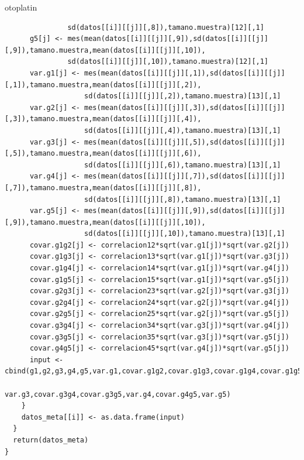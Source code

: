 otoplatin\documentclass[a4paper,openright,12pt]{report}
\begin{document}
{\begin{verbatim}
               sd(datos[[i]][[j]][,8]),tamano.muestra)[12][,1]
      g5[j] <- mes(mean(datos[[i]][[j]][,9]),sd(datos[[i]][[j]][,9]),tamano.muestra,mean(datos[[i]][[j]][,10]),
               sd(datos[[i]][[j]][,10]),tamano.muestra)[12][,1]
      var.g1[j] <- mes(mean(datos[[i]][[j]][,1]),sd(datos[[i]][[j]][,1]),tamano.muestra,mean(datos[[i]][[j]][,2]),
                   sd(datos[[i]][[j]][,2]),tamano.muestra)[13][,1]
      var.g2[j] <- mes(mean(datos[[i]][[j]][,3]),sd(datos[[i]][[j]][,3]),tamano.muestra,mean(datos[[i]][[j]][,4]),
                   sd(datos[[i]][[j]][,4]),tamano.muestra)[13][,1]
      var.g3[j] <- mes(mean(datos[[i]][[j]][,5]),sd(datos[[i]][[j]][,5]),tamano.muestra,mean(datos[[i]][[j]][,6]),
                   sd(datos[[i]][[j]][,6]),tamano.muestra)[13][,1]
      var.g4[j] <- mes(mean(datos[[i]][[j]][,7]),sd(datos[[i]][[j]][,7]),tamano.muestra,mean(datos[[i]][[j]][,8]),
                   sd(datos[[i]][[j]][,8]),tamano.muestra)[13][,1]
      var.g5[j] <- mes(mean(datos[[i]][[j]][,9]),sd(datos[[i]][[j]][,9]),tamano.muestra,mean(datos[[i]][[j]][,10]),
                   sd(datos[[i]][[j]][,10]),tamano.muestra)[13][,1]
      covar.g1g2[j] <- correlacion12*sqrt(var.g1[j])*sqrt(var.g2[j])
      covar.g1g3[j] <- correlacion13*sqrt(var.g1[j])*sqrt(var.g3[j])
      covar.g1g4[j] <- correlacion14*sqrt(var.g1[j])*sqrt(var.g4[j])
      covar.g1g5[j] <- correlacion15*sqrt(var.g1[j])*sqrt(var.g5[j])
      covar.g2g3[j] <- correlacion23*sqrt(var.g2[j])*sqrt(var.g3[j])
      covar.g2g4[j] <- correlacion24*sqrt(var.g2[j])*sqrt(var.g4[j])
      covar.g2g5[j] <- correlacion25*sqrt(var.g2[j])*sqrt(var.g5[j])
      covar.g3g4[j] <- correlacion34*sqrt(var.g3[j])*sqrt(var.g4[j])
      covar.g3g5[j] <- correlacion35*sqrt(var.g3[j])*sqrt(var.g5[j])
      covar.g4g5[j] <- correlacion45*sqrt(var.g4[j])*sqrt(var.g5[j])
      input <- cbind(g1,g2,g3,g4,g5,var.g1,covar.g1g2,covar.g1g3,covar.g1g4,covar.g1g5,var.g2,covar.g2g3,covar.g2g4,covar.g2g5,
                     var.g3,covar.g3g4,covar.g3g5,var.g4,covar.g4g5,var.g5)
    }
    datos_meta[[i]] <- as.data.frame(input)
  }
  return(datos_meta)
}
\end{verbatim}}
\end{document}
